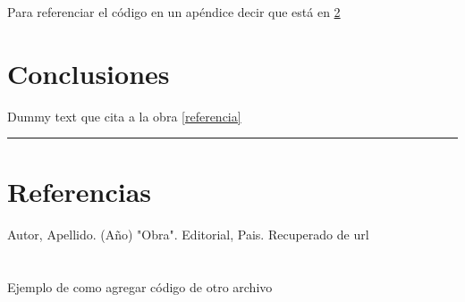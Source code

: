 \documentclass{article}
\begin{document}
Para referenciar el código en un apéndice decir que está en \ref{codigo}

\section{Conclusiones}
Dummy text que cita a la obra \ref{referencia}

\noindent\rule{\textwidth}{1pt}

\section*{Referencias}
\setcounter{secnumdepth}{4}
\renewcommand{\theparagraph}{\textsuperscript{[\arabic{paragraph}]}}

\paragraph{} Autor, Apellido. (Año) "Obra". Editorial, Pais. Recuperado de url\label{referencia}

\newpage

\appendix
\renewcommand\thesection{Apéndice \Alph{section}}

\section{}\label{codigo}
Ejemplo de como agregar código de otro archivo


\newpage
\section{}
\end{document}
